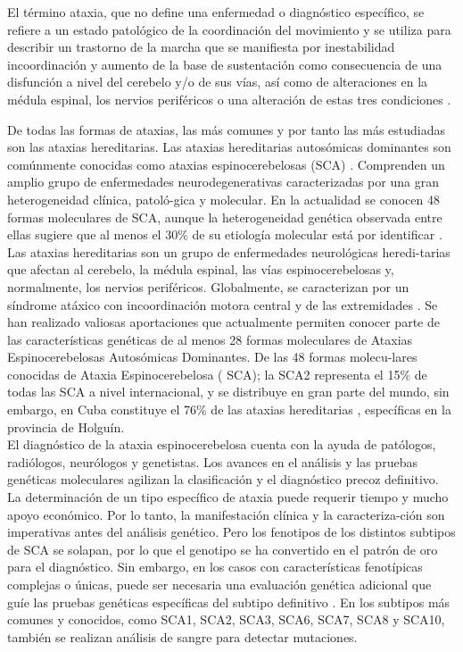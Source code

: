 \documentclass[a4paper,12pt]{article}
\begin{document}
	
El término ataxia, que no define una enfermedad o diagnóstico específico, se refiere a un estado patológico de la coordinación del movimiento \cite{luis_velazquez_perez_ataxia_2012,almaguer-gotay_spinocerebellar_2017,wilke_neurofilaments_2020} y se utiliza para describir un trastorno de la marcha que se manifiesta por inestabilidad incoordinación y aumento de la base de sustentación como consecuencia de una disfunción a nivel del cerebelo y/o de sus vías, así como de alteraciones en la médula espinal, los nervios periféricos o una alteración de estas tres condiciones \cite{almaguer-gotay_spinocerebellar_2017}.

De todas las formas de ataxias, las más comunes y por tanto las más estudiadas son las ataxias hereditarias.  Las ataxias hereditarias autosómicas dominantes son comúnmente conocidas como ataxias espinocerebelosas (SCA) \cite{mascalchi_neuroimaging_2020,rodriguez-labrada_founder_2020,prooije_spinocerebellar_2021}. Comprenden un amplio grupo de enfermedades neurodegenerativas caracterizadas por una gran heterogeneidad clínica, patoló-gica y molecular. En la actualidad se conocen 48 formas moleculares de SCA, aunque la heterogeneidad genética observada entre ellas sugiere que al menos el 30\% de su etiología molecular está por identificar \cite{luis_velazquez_perez_ataxia_2012}. \\
Las ataxias hereditarias son un grupo de enfermedades neurológicas heredi-tarias que afectan al cerebelo, la médula espinal, las vías espinocerebelosas y, normalmente, los nervios periféricos. Globalmente, se caracterizan por un síndrome atáxico con incoordinación motora central y de las extremidades \cite{paap_standardized_2016,assistance_publique_-_hopitaux_de_paris_identification_2019}. 
Se han realizado valiosas aportaciones que actualmente permiten conocer parte de las características genéticas de al menos 28 formas moleculares de Ataxias Espinocerebelosas Autosómicas Dominantes. De las 48 formas molecu-lares conocidas de Ataxia Espinocerebelosa ( SCA); la SCA2 representa el 15\% de todas las SCA a nivel internacional, y se distribuye en gran parte del mundo, sin embargo, en Cuba constituye el 76\% de las ataxias hereditarias \cite{meira_neuroradiological_2019,bhandari_spinocerebellar_2022}, específicas en la provincia de Holguín. \\
El diagnóstico de la ataxia espinocerebelosa cuenta con la ayuda de patólogos, radiólogos, neurólogos y genetistas. Los avances en el análisis y las pruebas genéticas moleculares agilizan la clasificación y el diagnóstico precoz definitivo. La determinación de un tipo específico de ataxia puede requerir tiempo y mucho apoyo económico. Por lo tanto, la manifestación clínica y la caracteriza-ción son imperativas antes del análisis genético. Pero los fenotipos de los distintos subtipos de SCA se solapan, por lo que el genotipo se ha convertido en el patrón de oro para el diagnóstico. Sin embargo, en los casos con características fenotípicas complejas o únicas, puede ser necesaria una evaluación genética adicional que guíe las pruebas genéticas específicas del subtipo definitivo \cite{silva_diagnosis_2019}.  En los subtipos más comunes y conocidos, como SCA1, SCA2, SCA3, SCA6, SCA7, SCA8 y SCA10, también se realizan análisis de sangre para detectar mutaciones. 
\end{document}
